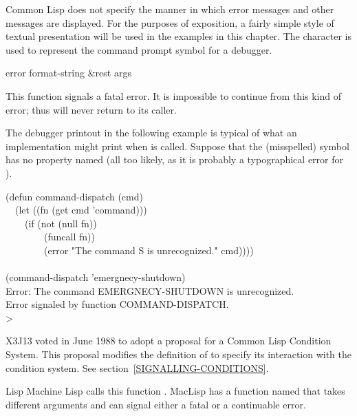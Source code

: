 Common Lisp does not specify the manner in which error messages and
other messages are displayed.  For the purposes of exposition,
a fairly simple style of textual presentation will be used in the
examples in this chapter.  The character \cdf{>} is used
to represent the command prompt symbol for a debugger.

\begin{defun}[Function]
error format-string &rest args

\begin{obsolete}\noindent
This function signals a fatal error.  It is impossible to continue
from this kind of 
error; thus  will never return to its caller.

The debugger printout in the following example is typical of what
an implementation might print when  is called.
Suppose that the (misspelled) symbol  has no property
named  (all too likely, as it is probably a typographical
error for ).
\begin{lisp}
(defun command-dispatch (cmd) \\
~~(let ((fn (get cmd 'command))) \\
~~~~(if (not (null fn)) \\
~~~~~~~~(funcall fn)) \\
~~~~~~~~(error "The command {\Xtilde}S is unrecognized." cmd)))) \\
 \\
(command-dispatch 'emergnecy-shutdown) \\
Error: The command EMERGNECY-SHUTDOWN is unrecognized. \\
Error signaled by function COMMAND-DISPATCH. \\
> 
\end{lisp}
\end{obsolete}

\begin{new}
X3J13 voted in June 1988
to adopt a proposal for a Common Lisp Condition System. 
This proposal modifies the definition of  to specify its interaction
with the condition system.  See section~\ref{SIGNALLING-CONDITIONS}.
\end{new}

\beforenoterule
\begin{incompatibility}
Lisp Machine Lisp calls this function .
MacLisp has a function named  that takes
different arguments and can signal either a fatal or a continuable error.
\end{incompatibility}
\afternoterule
\end{defun}

